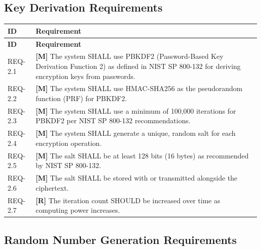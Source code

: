 \documentclass[11pt,letterpaper]{article}
\begin{document}
\subsection{Key Derivation Requirements}

\begin{longtable}{@{}p{1.2cm}p{12cm}@{}}
\toprule
\textbf{ID} & \textbf{Requirement} \\
\midrule
\endfirsthead
\toprule
\textbf{ID} & \textbf{Requirement} \\
\midrule
\endhead

REQ-2.1 & \textcolor{mandatory}{\textbf{[M]}} The system SHALL use PBKDF2 (Password-Based Key Derivation Function 2) as defined in NIST SP 800-132 for deriving encryption keys from passwords. \\[6pt]

REQ-2.2 & \textcolor{mandatory}{\textbf{[M]}} The system SHALL use HMAC-SHA256 as the pseudorandom function (PRF) for PBKDF2. \\[6pt]

REQ-2.3 & \textcolor{mandatory}{\textbf{[M]}} The system SHALL use a minimum of 100,000 iterations for PBKDF2 per NIST SP 800-132 recommendations. \\[6pt]

REQ-2.4 & \textcolor{mandatory}{\textbf{[M]}} The system SHALL generate a unique, random salt for each encryption operation. \\[6pt]

REQ-2.5 & \textcolor{mandatory}{\textbf{[M]}} The salt SHALL be at least 128 bits (16 bytes) as recommended by NIST SP 800-132. \\[6pt]

REQ-2.6 & \textcolor{mandatory}{\textbf{[M]}} The salt SHALL be stored with or transmitted alongside the ciphertext. \\[6pt]

REQ-2.7 & \textcolor{recommended}{\textbf{[R]}} The iteration count SHOULD be increased over time as computing power increases. \\[6pt]

\bottomrule
\end{longtable}

\subsection{Random Number Generation Requirements}
\end{document}

